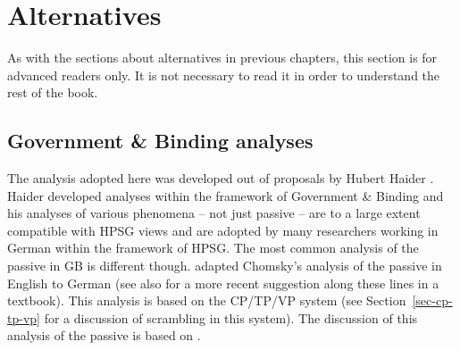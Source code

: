 



\section{Alternatives}

As with the sections about alternatives in previous chapters, this section is for advanced readers
only. It is not necessary to read it in order to understand the rest of the book.


\subsection{Government \& Binding analyses}
\label{sec-passive-GB}

The analysis adopted here was developed out of proposals by Hubert Haider
\citeyearpar{Haider86}. Haider developed analyses within the framework of Government \& Binding
\citep{Chomsky81a} and his analyses of various phenomena -- not just passive -- are to a large extent compatible with HPSG views and are adopted
by many researchers working in German within the framework of HPSG. The most common analysis of the
passive in GB is different though.  \cites[155--157]{Grewendorf88a}[]{Grewendorf93} adapted Chomsky's analysis of the passive in
English \citep[]{Chomsky81a} to German (see also \citealt[]{Lohnstein2014a} for a
more recent suggestion along these lines in a textbook). This analysis is based on the CP/TP/VP system (see Section~\ref{sec-cp-tp-vp} for a discussion of
scrambling in this system). The discussion of this analysis of the passive is based on .

